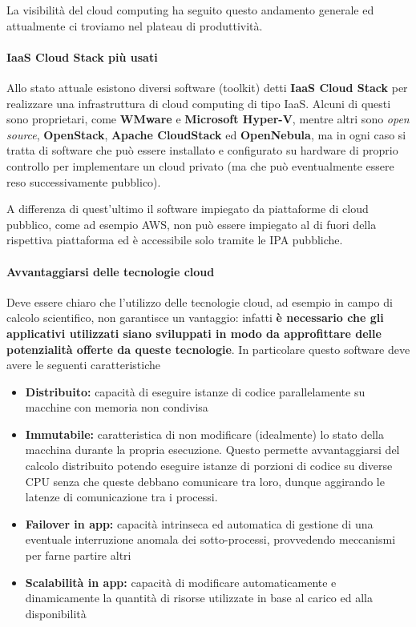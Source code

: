 \documentclass[italian,]{article}
\providecommand{\tightlist}{%
  \setlength{\itemsep}{0pt}\setlength{\parskip}{0pt}}
\let\oldparagraph\paragraph
\renewcommand{\paragraph}[1]{\oldparagraph{#1}\mbox{}}
\begin{document}
La visibilità del cloud computing ha seguito questo andamento generale
ed attualmente ci troviamo nel plateau di produttività.

\paragraph{IaaS Cloud Stack più
usati}\label{iaas-cloud-stack-piuxf9-usati}

Allo stato attuale esistono diversi software (toolkit) detti
\textbf{IaaS Cloud Stack} per realizzare una infrastruttura di cloud
computing di tipo IaaS. Alcuni di questi sono proprietari, come
\textbf{WMware} e \textbf{Microsoft Hyper-V}, mentre altri sono
\emph{open source}, \textbf{OpenStack}, \textbf{Apache CloudStack} ed
\textbf{OpenNebula}, ma in ogni caso si tratta di software che può
essere installato e configurato su hardware di proprio controllo per
implementare un cloud privato (ma che può eventualmente essere reso
successivamente pubblico).

A differenza di quest'ultimo il software impiegato da piattaforme di
cloud pubblico, come ad esempio AWS, non può essere impiegato al di
fuori della rispettiva piattaforma ed è accessibile solo tramite le IPA
pubbliche.

\paragraph{Avvantaggiarsi delle tecnologie
cloud}\label{avvantaggiarsi-delle-tecnologie-cloud}

Deve essere chiaro che l'utilizzo delle tecnologie cloud, ad esempio in
campo di calcolo scientifico, non garantisce un vantaggio: infatti
\textbf{è necessario che gli applicativi utilizzati siano sviluppati in
modo da approfittare delle potenzialità offerte da queste tecnologie}.
In particolare questo software deve avere le seguenti caratteristiche

\begin{itemize}
\tightlist
\item
  \textbf{Distribuito:} capacità di eseguire istanze di codice
  parallelamente su macchine con memoria non condivisa
\item
  \textbf{Immutabile:} caratteristica di non modificare (idealmente) lo
  stato della macchina durante la propria esecuzione. Questo permette
  avvantaggiarsi del calcolo distribuito potendo eseguire istanze di
  porzioni di codice su diverse CPU senza che queste debbano comunicare
  tra loro, dunque aggirando le latenze di comunicazione tra i processi.
\item
  \textbf{Failover in app:} capacità intrinseca ed automatica di
  gestione di una eventuale interruzione anomala dei sotto-processi,
  provvedendo meccanismi per farne partire altri
\item
  \textbf{Scalabilità in app:} capacità di modificare automaticamente e
  dinamicamente la quantità di risorse utilizzate in base al carico ed
  alla disponibilità
\end{itemize}
\end{document}
